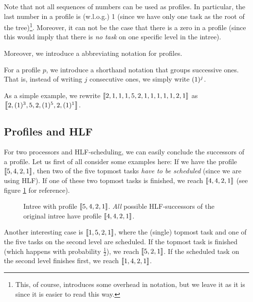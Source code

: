Note that not all sequences of numbers can be used as profiles. In particular, the last number in a profile is (w.l.o.g.) 1 (since we have only one task as the root of the tree)\footnote{This, of course, introduces some overhead in notation, but we leave it as it is since it is easier to read this way.}. Moreover, it can not be the case that there is a zero in a profile (since this would imply that there is \emph{no task} on one specific level in the intree).

Moreover, we introduce a abbreviating notation for profiles.

\begin{definition}
  For a profile $p$, we introduce a shorthand notation that groups successive ones. That is, instead of writing $j$ consecutive ones, we simply write $(1)^{j}$.
\end{definition}

As a simple example, we rewrite $\left\llbracket 2,1,1,1,5,2,1,1,1,1,1,2,1 \right\rrbracket$ as 
$\left\llbracket 2,(1)^{3},5,2,(1)^{5},2,(1)^{1} \right\rrbracket$.

\subsection{Profiles and HLF}
\label{sec:p2-simple-method-runtime-profiles-hlf}

For two processors and HLF-scheduling, we can easily conclude the successors of a profile. Let us first of all consider some examples here: If we have the profile $\left\llbracket 5,4,2,1 \right\rrbracket$, then two of the five topmost tasks \emph{have to be scheduled} (since we are using HLF). If one of these two topmost tasks is finished, we reach $\left\llbracket 4,4,2,1 \right\rrbracket$ (see figure \ref{fig:p2-profiles-successors-of-5421-always-same} for reference).

\begin{figure}[ht]
  \centering
  
  \caption{Intree with profile $\left\llbracket 5,4,2,1 \right\rrbracket$. \emph{All} possible HLF-successors of the original intree have profile $\left\llbracket 4,4,2,1 \right\rrbracket$.}
  \label{fig:p2-profiles-successors-of-5421-always-same}
\end{figure}


Another interesting case is $\left\llbracket 1,5,2,1 \right\rrbracket$, where the (single) topmost task and one of the five tasks on the second level are scheduled. If the topmost task is finished (which happens with probability $\frac{1}{2}$), we reach $\left\llbracket 5,2,1 \right\rrbracket$. If the scheduled task on the second level finishes first, we reach $\left\llbracket 1,4,2,1 \right\rrbracket$.

